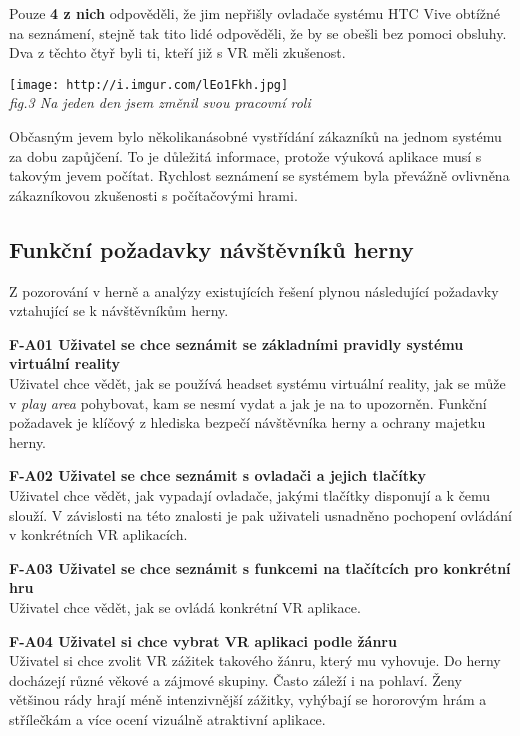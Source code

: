 Pouze \textbf{4 z nich} odpověděli, že jim nepřišly ovladače systému HTC
Vive obtížné na seznámení, stejně tak tito lidé odpověděli, že by se
obešli bez pomoci obsluhy. Dva z těchto čtyř byli ti, kteří již s VR
měli zkušenost.

\texttt{[image: http://i.imgur.com/lEo1Fkh.jpg]}\\
\emph{fig.3 Na jeden den jsem změnil svou pracovní roli}

Občasným jevem bylo několikanásobné vystřídání zákazníků na jednom
systému za dobu zapůjčení. To je důležitá informace, protože výuková
aplikace musí s takovým jevem počítat. Rychlost seznámení se systémem
byla převážně ovlivněna zákazníkovou zkušenosti s počítačovými hrami.

\subsection{Funkční požadavky návštěvníků
herny}\label{funkux10dnuxed-poux17eadavky-nuxe1vux161tux11bvnuxedkux16f-herny}

Z pozorování v herně a analýzy existujících řešení plynou následující
požadavky vztahující se k návštěvníkům herny.

\textbf{F-A01 Uživatel se chce seznámit se základními pravidly systému
virtuální reality}\\
Uživatel chce vědět, jak se používá headset systému virtuální reality,
jak se může v \emph{play area} pohybovat, kam se nesmí vydat a jak je na
to upozorněn. Funkční požadavek je klíčový z hlediska bezpečí
návštěvníka herny a ochrany majetku herny.

\textbf{F-A02 Uživatel se chce seznámit s ovladači a jejich tlačítky}\\
Uživatel chce vědět, jak vypadají ovladače, jakými tlačítky disponují a
k čemu slouží. V závislosti na této znalosti je pak uživateli usnadněno
pochopení ovládání v konkrétních VR aplikacích.

\textbf{F-A03 Uživatel se chce seznámit s funkcemi na tlačítcích pro
konkrétní hru}\\
Uživatel chce vědět, jak se ovládá konkrétní VR aplikace.

\textbf{F-A04 Uživatel si chce vybrat VR aplikaci podle žánru}\\
Uživatel si chce zvolit VR zážitek takového žánru, který mu vyhovuje. Do
herny docházejí různé věkové a zájmové skupiny. Často záleží i na
pohlaví. Ženy většinou rády hrají méně intenzivnější zážitky, vyhýbají
se hororovým hrám a střílečkám a více ocení vizuálně atraktivní
aplikace.

